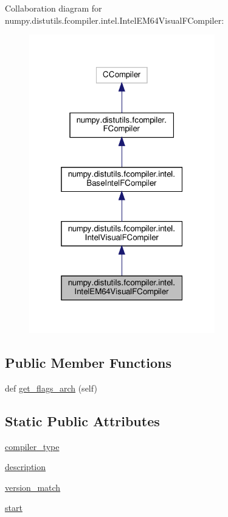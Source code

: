 Collaboration diagram for numpy.\+distutils.\+fcompiler.\+intel.\+Intel\+E\+M64\+Visual\+F\+Compiler\+:
\nopagebreak
\begin{figure}[H]
\begin{center}
\leavevmode
\includegraphics[width=229pt]{classnumpy_1_1distutils_1_1fcompiler_1_1intel_1_1IntelEM64VisualFCompiler__coll__graph}
\end{center}
\end{figure}
\subsection*{Public Member Functions}
\begin{DoxyCompactItemize}
\item 
def \hyperlink{classnumpy_1_1distutils_1_1fcompiler_1_1intel_1_1IntelEM64VisualFCompiler_a7f587c667f35de29bf38f3a0c0df9556}{get\+\_\+flags\+\_\+arch} (self)
\end{DoxyCompactItemize}
\subsection*{Static Public Attributes}
\begin{DoxyCompactItemize}
\item 
\hyperlink{classnumpy_1_1distutils_1_1fcompiler_1_1intel_1_1IntelEM64VisualFCompiler_a942184e9104488cae4add2d97eeb18a3}{compiler\+\_\+type}
\item 
\hyperlink{classnumpy_1_1distutils_1_1fcompiler_1_1intel_1_1IntelEM64VisualFCompiler_a766c51675d86a4391beba629450fd091}{description}
\item 
\hyperlink{classnumpy_1_1distutils_1_1fcompiler_1_1intel_1_1IntelEM64VisualFCompiler_a0b11986241226405efa85ca1825d2cec}{version\+\_\+match}
\item 
\hyperlink{classnumpy_1_1distutils_1_1fcompiler_1_1intel_1_1IntelEM64VisualFCompiler_a4c77a2fb66f546edd8034a84afb684e7}{start}
\end{DoxyCompactItemize}


